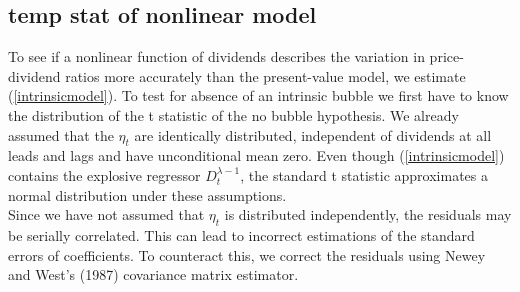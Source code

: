 \documentclass{article}
\begin{document}
\subsection{temp stat of nonlinear model}


To see if a nonlinear function of dividends describes the variation in price-dividend ratios more accurately than the present-value model, we estimate (\ref{intrinsicmodel}). To test for absence of an intrinsic bubble we first have to know the distribution of the t statistic of the no bubble hypothesis. We already assumed that the $\eta_t$ are identically distributed, independent of dividends at all leads and lags and have unconditional mean zero. Even though (\ref{intrinsicmodel}) contains the explosive regressor $D_t^{\lambda - 1}$, the standard t statistic approximates a normal distribution under these assumptions\footnotemark. 
\\
Since we have not assumed that $\eta_t$ is distributed independently, the residuals may be serially correlated. This can lead to incorrect estimations of the standard errors of coefficients. To counteract this, we correct the residuals using Newey and West's (1987) covariance matrix estimator.
\end{document}
